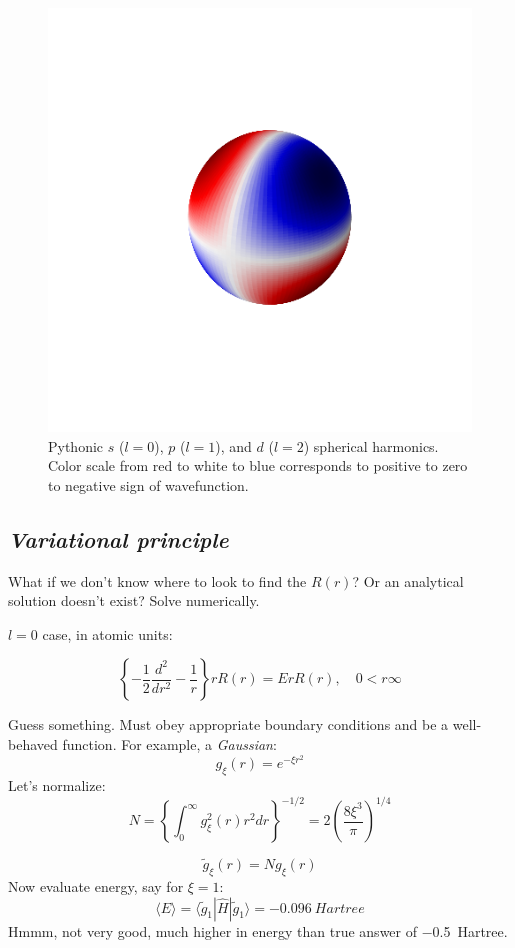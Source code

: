 \documentclass[11pt]{article}
\begin{document}
\begin{figure}
\includegraphics[scale=0.4]{./Images/d.png}
\caption{Pythonic $s$ ($l = 0$), $p$ ($l=1$), and $d$ ($l=2$) spherical harmonics. Color scale from red to white to blue corresponds to positive to zero to negative sign of wavefunction.}
\end{figure}

\subsection{\emph{Variational principle}}
\label{sec:org3a7af21}
What if we don't know where to look to find the \(R(r)\)?  Or an analytical solution doesn't exist?  Solve numerically.

\(l=0\) case, in atomic units:

\[\left\{-\frac{1}{2}\frac{d^2}{dr^2} -\frac{1}{r}\right\} rR(r) = ErR(r),\quad 0<r\infty \]

Guess something.  Must obey appropriate boundary conditions and be a well-behaved function.  For example, a \emph{Gaussian}:
\[g_\xi(r) = e^{-\xi r^2}\]
Let's normalize:
\[N = \left\{ \int_0^\infty g_\xi^2(r) r^2 dr \right\}^{-1/2} = 2 \left(\frac{8\xi^3}{\pi}\right)^{1/4} \]

\[\tilde{g}_\xi(r) = N g_\xi(r)\]
Now evaluate energy, say for \(\xi=1\):
\[\langle E \rangle = \langle \tilde{g}_1|\hat{H}|\tilde{g}_1\rangle = \SI{-0.096}{Hartree} \]
Hmmm, not very good, much higher in energy than true answer of \SI{-0.5}{Hartree}. 
\end{document}
